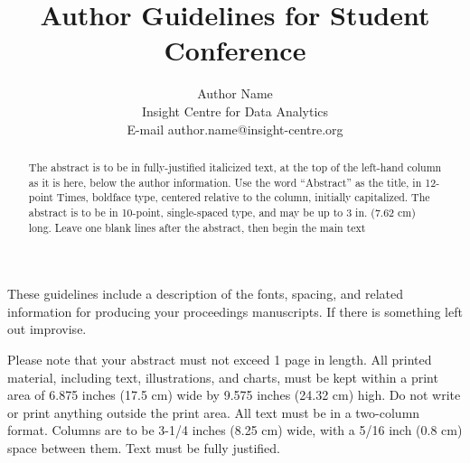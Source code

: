 \documentclass[times, 10pt, twocolumn, a4paper]{article}
\begin{document}
\title{Author Guidelines for Student Conference} %

\author{Author Name\\
Insight Centre for Data Analytics\\ 
E-mail author.name@insight-centre.org\\
}

\maketitle

\thispagestyle{empty} %

\begin{abstract}
The abstract is to be in fully-justified italicized text, at the top of the left-hand column as it is here, below the author information. Use the word “Abstract” as the title, in 12-point Times, boldface type, centered relative to the column, initially capitalized. The abstract is to be in 10-point, single-spaced type, and may be up to 3 in. (7.62 cm) long. Leave one blank lines after the abstract, then begin the main text
\end{abstract}
These guidelines include a description of the fonts, spacing, and related information for producing your proceedings manuscripts. If there is something left out improvise. 

Please note that your abstract must not exceed 1 page in length. \cite{ex1}
All printed material, including text, illustrations, and charts, must be kept within a print area of 6.875 inches (17.5 cm) wide by 9.575 inches (24.32 cm) high. Do not write or print anything outside the print area. All text must be in a two-column format. Columns are to be 3-1/4 inches (8.25 cm) wide, with a 5/16 inch (0.8 cm) space between them. Text must be fully justified.
\end{document}

